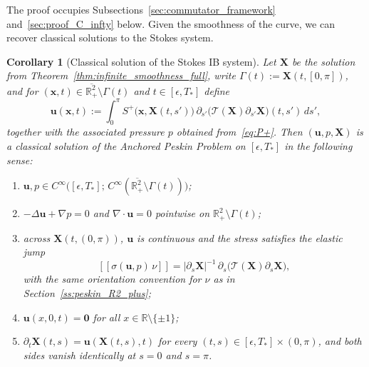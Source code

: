 \documentclass{amsart}
\newtheorem{corollary}[theorem]{Corollary}
\begin{document}
\noindent The proof occupies Subsections~\ref{sec:commutator_framework} and~\ref{sec:proof_C_infty} below.  Given the smoothness of the curve, we can recover classical solutions to the Stokes system.

\begin{corollary}[Classical solution of the Stokes IB system]
\label{cor:classical_stokes}
Let $\mathbf{X}$ be the solution from Theorem~\ref{thm:infinite_smoothness_full}, write $\Gamma(t) := \mathbf{X}(t,[0,\pi])$, and for $(\mathbf{x},t) \in \overline{\mathbb{R}^2_+}\setminus\Gamma(t)$ and $t\in[\epsilon,T_*]$ define
\[
\mathbf{u}(\mathbf{x},t) := \int_0^\pi S^+\bigl(\mathbf{x},\mathbf{X}(t,s')\bigr)
  \,\partial_{s'}\!\bigl(\mathcal{T}(\mathbf{X})\partial_{s'}\mathbf{X}\bigr)(t,s')\,ds',
\]
together with the associated pressure $p$ obtained from~\eqref{eq:P+}. Then $(\mathbf{u}, p, \mathbf{X})$ is a classical solution of the Anchored Peskin Problem on $[\epsilon, T_*]$ in the following sense:
\begin{enumerate}
\item $\mathbf{u}, p \in C^\infty\bigl([\epsilon,T_*];\,C^\infty(\overline{\mathbb{R}^2_+}\setminus \Gamma(t))\bigr)$;
\item $-\Delta\mathbf{u} + \nabla p = 0$ and $\nabla\cdot\mathbf{u} = 0$ pointwise on
       $\mathbb{R}^2_+\setminus\Gamma(t)$;
\item across $\mathbf{X}(t,(0,\pi))$, $\mathbf{u}$ is continuous and the stress
       satisfies the elastic jump
\[
[\![\sigma(\mathbf{u},p)\,\nu]\!]
       = |\partial_s\mathbf{X}|^{-1}\,
          \partial_s\!\bigl(\mathcal{T}(\mathbf{X})\partial_s\mathbf{X}\bigr),
\]
with the same orientation convention for $\nu$ as in Section~\ref{ss:peskin_R2_plus};
\item $\mathbf{u}(x,0,t) = \mathbf{0}$ for all $x \in \mathbb{R}\setminus\{\pm 1\}$;
\item $\partial_t\mathbf{X}(t,s) = \mathbf{u}(\mathbf{X}(t,s),t)$ for every
       $(t,s) \in [\epsilon, T_*] \times (0,\pi)$, and both sides vanish
       identically at $s = 0$ and $s = \pi$.
\end{enumerate}
\end{corollary}
\end{document}
